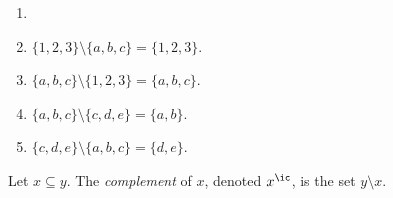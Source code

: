 \documentclass{amsart}
\begin{document}
\begin{eg}
  \begin{enumerate}
  \item[]
  \item $\{1,2,3\} \setminus \{a,b,c\} = \{1,2,3\}$.
  \item $\{a,b,c\} \setminus \{1,2,3\} = \{a,b,c\}$.
  \item $\{a,b,c\} \setminus \{c,d,e\} = \{a,b\}$.
  \item $\{c,d,e\} \setminus \{a,b,c\} = \{d,e\}$.
  \end{enumerate}
\end{eg}

\begin{defn}
  Let $x \subseteq y$.
  The \emph{complement} of $x$, denoted $x^{\ic}$, is the set $y \setminus x$.
\end{defn}
\end{document}
